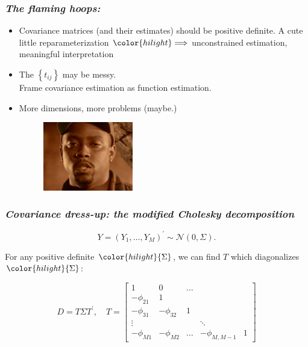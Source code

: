 \documentclass[12pt]{beamer}
\newcommand{\bi}{\begin{itemize}}
\newcommand{\ei}{\end{itemize}}
\newcommand{\newthought}[1]{{\small \color{hilight} {#1}}}
\newcommand\myfootnote[1]{%
  \begingroup
  \renewcommand\thefootnote{}\footnote{#1}%
  \addtocounter{footnote}{-1}%
  \endgroup
}
\begin{document}
\begin{frame}
\frametitle{\emph{The flaming hoops:}}
\bi
\item Covariance matrices (and their estimates) should be positive definite.
	\newthought{A cute little reparameterization } $\color{hilight} \Longrightarrow$ \newthought{unconstrained estimation, meaningful interpretation} 
\item The $\left\{t_{ij} \right\}$ may be messy. \\
	\newthought{Frame covariance estimation as function estimation.} 
\item  More dimensions, more problems (maybe.) \\
\begin{figure}
\graphicspath{{img/}}
  \includegraphics[height=3cm]{ripnatedogg}
\end{figure}
\ei
\end{frame}



\begin{frame}
\frametitle{\emph{Covariance dress-up: the modified Cholesky decomposition}}

\begin{equation*}
Y = \left(Y_1, \dots, Y_M \right)^\prime \sim \mathcal{N}\left(0,\Sigma\right).
\end{equation*}

\newthought{For any positive definite} $\color{hilight}{\Sigma}$, \newthought{we can find $T$ which diagonalizes} $\color{hilight}{\Sigma}$:

\begin{equation*}
D = T \Sigma T^\prime, \quad T = \begin{bmatrix} 1 & 0 & \dots & & \\ -\phi_{21} & 1 & & & \\ -\phi_{31}& -\phi_{32} &  1 & & \\ \vdots & & & \ddots & \\ -\phi_{M1} &-\phi_{M2} & \dots & -\phi_{M,M-1}& 1  \end{bmatrix}
\end{equation*}
\end{frame}
\end{document}
